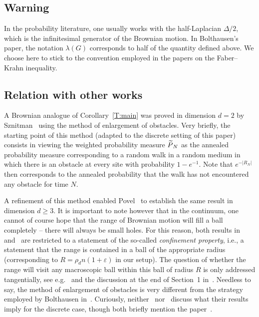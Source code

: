\documentclass[AHL, Unicode, longabstracts, published]{cedram}
\newcommand*\eps{\varepsilon}
\let\oldtilde\tilde
\renewcommand*{\tilde}[1]{\mathchoice{\widetilde{#1}}{\widetilde{#1}}{\oldtilde{#1}}{\oldtilde{#1}}}\let\oldhat\hat
\renewcommand*{\hat}[1]{\mathchoice{\widehat{#1}}{\widehat{#1}}{\oldhat{#1}}{\oldhat{#1}}}\let\oldexists\exists
\renewcommand*{\exists}{\mathrel{\oldexists}}
\begin{document}
\subsection*{Warning}
In the probability literature, one usually works with the half-Laplacian $\Delta/2$, which is the infinitesimal generator of the Brownian motion. In Bolthausen's paper, the notation $\lambda(G)$ corresponds to half of the quantity defined above. We choose here to stick to the convention employed in the papers on the Faber--Krahn inequality.



\subsection{Relation with other works}


A Brownian analogue of Corollary~\ref{T:main} was proved in dimension $d=2$ by Sznitman~\cite{Sznitman} using the method of enlargement of obstacles. Very briefly, the starting point of this method (adapted to the discrete setting of this paper) consists in viewing the weighted probability measure $\tilde P_N$ as the annealed probability measure corresponding to a random walk in a random medium in which there is an obstacle at every site with probability $1-e^{-1}$. Note that $e^{- |R_N|}$ then corresponds to the annealed probability that the walk has not encountered any obstacle for time $N$.

A refinement of this method enabled Povel~\cite{Povel} to establish the same result in dimension $d \ge 3$. It is important to note however that in the continuum, one cannot of course hope that the range of Brownian motion will fill a ball completely -- there will always be small holes. For this reason, both results in~\cite{Sznitman} and~\cite{Povel} are restricted to a statement of the so-called \emph{confinement property}, i.e., a statement that the range is contained in a ball of the appropriate radius (corresponding to $R = \rho_d n (1+ \eps)$ in our setup). The question of whether the range will visit any macroscopic ball within this ball of radius $R$ is only addressed tangentially, see e.g.~\cite[Theorem~4.3]{Sznitman} and the discussion at the end of Section~1 in~\cite{Povel}. Needless to say, the method of enlargement of obstacles is very different from the strategy employed by Bolthausen in~\cite{BO}. Curiously, neither~\cite{Sznitman} nor~\cite{Povel} discuss what their results imply for the discrete case, though both briefly mention the paper~\cite{BO}.
\end{document}
